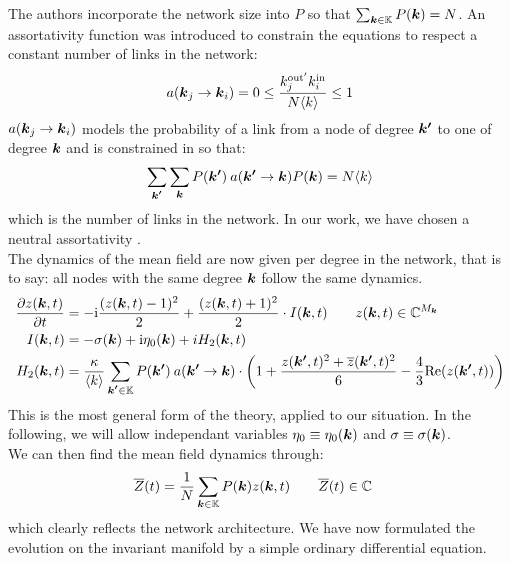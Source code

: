 The authors incorporate the network size into $P$ so that $\sum_{{\boldsymbol{k}} \in {\mathbb{K}}} P({\boldsymbol{k}}) = N$. An assortativity function was introduced to constrain the equations to respect a constant number of links in the network:
\begin{align}
a\left(\k_j \rightarrow \k_i \right) = 0 \leq \frac{k^{\rm{out}^{\prime}}_j k^{\rm{in}}_i}{N \kmean} \leq 1 \label{eq:assortativityfunction}
\end{align}
$a\left(\k_j \rightarrow \k_i \right)$ models the probability of a link from a node of degree ${\boldsymbol{k'}}$ to one of degree ${\boldsymbol{k}}$ and is constrained in \cite{Restrepo2014} so that:
\begin{align*}
\sum_{\kacc} \sum_{\k} P\left( \kacc \right) \: a\left(\kacc \rightarrow \k\right) P\left(\k\right) = N\langle k\rangle
\end{align*}
which is the number of links in the network. In our work, we have chosen a neutral assortativity \cite{OttAntonsen2017}. \\

The dynamics of the mean field are now given per degree in the network, that is to say: all nodes with the same degree ${\boldsymbol{k}}$ follow the same dynamics.
\begin{align}
\frac{\partial z(\k, t)}{\partial t} &= -\ic \frac{(z(\k, t)-1)^{2}}{2} + \frac{(z(\k, t)+1)^{2}}{2} \cdot I(\k, t) \qquad z(\k,t) \in \C^{M_\k} \nonumber \\
I(\k, t) &= -\sigma(\k) + \ic \eta_{0}(\k) + i H_2(\k,t) \label{eq:OttAntonsenSystemFull} \\
H_2(\k,t) &= \frac{\kappa}{\kmean} \sum_{\kacc \in \K} P\left(\kacc\right) \: a\left(\kacc \rightarrow \k\right) \cdot \left( 1 + \frac{z(\kacc, t)^2 + \overline{z}(\kacc, t)^2}{6} - \frac{4}{3} \Re(z(\kacc, t)) \right) \nonumber
\end{align}
This is the most general form of the theory, applied to our situation. In the following, we will allow independant variables $\eta_0 \equiv \eta_0({\boldsymbol{k}})$ and $\sigma \equiv \sigma({\boldsymbol{k}})$. \\

We can then find the mean field dynamics through:
\begin{align}
\overline{Z}(t) &= \frac{1}{N} \sum_{{\boldsymbol{k}} \in {\mathbb{K}}} P({\boldsymbol{k}}) z({\boldsymbol{k}}, t) \qquad \overline{Z}(t) \in {\mathbb{C}} \label{eq:OttAntonsenMeanField}
\end{align}
which clearly reflects the network architecture. We have now formulated the evolution on the invariant manifold by a simple ordinary differential equation. 

